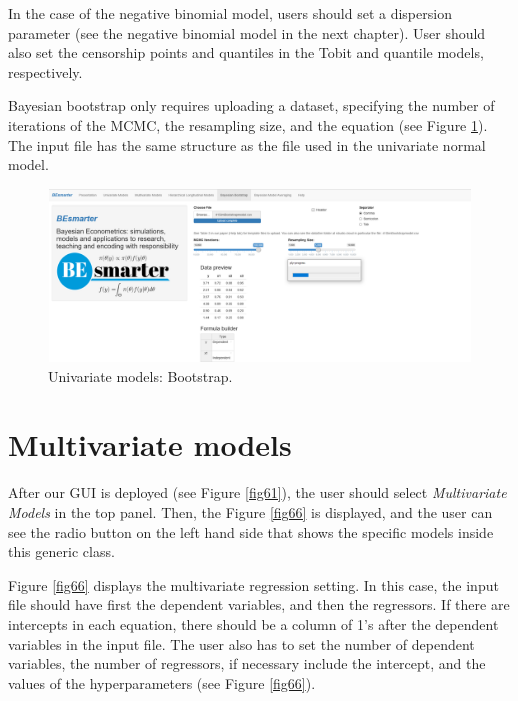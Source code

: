In the case of the negative binomial model, users should set a dispersion parameter (see the negative binomial model in the next chapter). User should also set the censorship points and quantiles in the Tobit and quantile models, respectively.

Bayesian bootstrap only requires uploading a dataset, specifying the number of iterations of the MCMC, the resampling size, and the equation (see Figure \ref{fig65}).
The input file has the same structure as the file used in the univariate normal model.

\begin{figure}
	\includegraphics[width=340pt, height=130pt]{Chapters/chapterGUI/figures/Figure5.png}
	\caption[List of figure caption goes here]{Univariate models: Bootstrap.}\label{fig65}
\end{figure}  

\section{Multivariate models}\label{secGUI3}
After our GUI is deployed (see Figure \ref{fig61}), the user should select \textit{Multivariate Models} in the top panel. Then, the Figure \ref{fig66} is displayed, and the user can see the radio button on the left hand side that shows the specific models inside this generic class.

Figure \ref{fig66} displays the multivariate regression setting. In this case, the input file should have first the dependent variables, and then the regressors. If there are intercepts in each equation, there should be a column of 1's after the dependent variables in the input file. The user also has to set the number of dependent variables, the number of regressors, if necessary include the intercept, and the values of the hyperparameters (see Figure \ref{fig66}).

